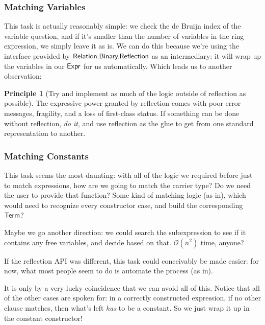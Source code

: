 \documentclass[draft, twocolumn]{article}
\theoremstyle{definition}
\theoremstyle{definition}
\newtheorem{principle}{Principle}[section]
\begin{document}
\subsubsection{Matching Variables}
This task is actually reasonably simple: we check the de Bruijn index of the
variable question, and if it's smaller than the number of variables in the ring
expression, we simply leave it as is. We can do this because we're using the
interface provided by \(\AgdaModule{Relation.Binary.Reflection}\) as an
intermediary: it will wrap up the variables in our \(\AgdaDatatype{Expr}\) for
us automatically. Which leads us to another observation:
\begin{principle}[Try and implement as much of the logic outside of reflection
    as possible]
  The expressive power granted by reflection comes with poor error messages,
  fragility, and a loss of first-class status. If something can be done without
  reflection, \emph{do it}, and use reflection as the glue to get from one
  standard representation to another.
\end{principle}
\subsubsection{Matching Constants}
This task seems the most daunting: with all of the logic we required before just
to match expressions, how are we going to match the carrier type? Do we need the
user to provide that function? Some kind of matching logic (as
in\cite{jedynak_simple_2018}), which would need to recognize every constructor
case, and build the corresponding \(\AgdaDatatype{Term}\)?

Maybe we go another direction: we could search the subexpression to see if it
contains any free variables, and decide based on that. \(\mathcal{O}(n^2)\)
time, anyone?

If the reflection API was different, this task could conceivably be made easier:
for now, what most people seem to do is automate the process (as
in\cite{norell_agda-prelude_2018}).

It is only by a very lucky coincidence that we can avoid all of this. Notice
that all of the other cases are spoken for: in a correctly constructed
expression, if no other clause matches, then what's left \emph{has} to be a
constant. So we just wrap it up in the constant constructor!

\resetlinenumber[1]

\begin{linenumbers}
\end{linenumbers}
\end{document}
